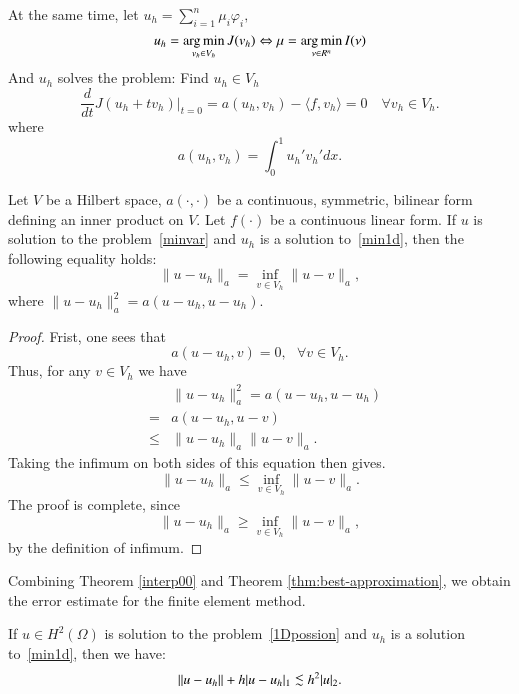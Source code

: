 At the same time, let $\displaystyle u_h=\sum_{i=1}^{n}\mu_i\varphi_i,$
\begin{equation}\label{min1d}
\displaystyle u_h=\operatorname*{arg\,min}_{v_h\in V_h} J(v_h)\Leftrightarrow \mu=\operatorname*{arg\,min}_{\nu \in R^n} I(\nu)
\end{equation}
And $u_h$ solves the problem: Find $u_h\in V_h$
\begin{equation}\label{1ddiscrevar}
\frac{d}{dt}J(u_h+t v_h)|_{t=0}=a(u_h,v_h)-\langle f, v_h\rangle=0 \quad \forall v_h\in V_h. 
\end{equation}
where 
$$
a(u_h,v_h)=\int_0^1 u_h'v_h'dx.
$$

\begin{theorem}\label{thm:best-approximation}
Let $V$ be a Hilbert space, $a(\cdot,\cdot)$ be a continuous,
symmetric, bilinear form defining an inner product on $V$. Let
$f(\cdot)$ be a continuous linear form. If $u$ is solution to the
problem~\eqref{minvar} and $u_h$ is a solution
to~\eqref{min1d}, then the following equality holds:
\begin{equation}\label{eq:best-approx}
\|u-u_h\|_a = \inf_{v\in V_h}\|u-v\|_a,
\end{equation}
where $\|u-u_h\|^2_a = a(u-u_h,u-u_h)$. 
\end{theorem}

\begin{proof}
Frist, one sees that
$$
a(u-u_h, v)=0,~~~\forall v\in V_h.
$$
Thus, for any $v\in V_h$ we have
\begin{eqnarray*}
& &\|u-u_h\|_a^2=a(u-u_h, u-u_h)\\[0.2cm]
&=& a(u-u_h, u-v)\\[0.2cm]
&\le& \|u-u_h\|_a\|u-v\|_a.
\end{eqnarray*}
Taking the infimum on both sides of this equation then gives. 
$$
\|u-u_h\|_a\le \inf_{v\in V_h}\|u-v\|_a.
$$
The proof is complete, since 
\[
\|u-u_h\|_a\ge \inf_{v\in V_h}\|u-v\|_a,
\]
by the definition of infimum. 
\end{proof}
Combining Theorem \ref{interp00} and Theorem \ref{thm:best-approximation}, we obtain the error estimate for the finite element method. 
\begin{theorem}
If $u\in H^2(\Omega)$ is solution to the
problem~\eqref{1Dpossion} and $u_h$ is a solution to~\eqref{min1d}, then we have:
\begin{equation}
 \|u-u_h\|+h |u-u_h|_{1}\lc h^2 |u|_2.
   \end{equation}
 \end{theorem}

